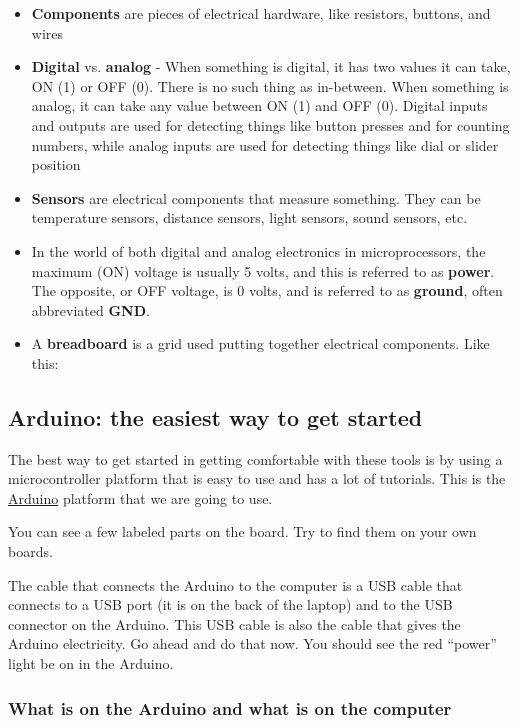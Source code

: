 \documentclass[letterpaper,10pt,english]{/usr/local/lib/python2.7/dist-packages/sphinx/texinputs/sphinxhowto}
\begin{document}
\begin{itemize}
\item
  \textbf{Components} are pieces of electrical hardware, like resistors,
  buttons, and wires
\item
  \textbf{Digital} vs. \textbf{analog} - When something is digital, it
  has two values it can take, ON (1) or OFF (0). There is no such thing
  as in-between. When something is analog, it can take any value between
  ON (1) and OFF (0). Digital inputs and outputs are used for detecting
  things like button presses and for counting numbers, while analog
  inputs are used for detecting things like dial or slider position
\item
  \textbf{Sensors} are electrical components that measure something.
  They can be temperature sensors, distance sensors, light sensors,
  sound sensors, etc.
\item
  In the world of both digital and analog electronics in
  microprocessors, the maximum (ON) voltage is usually 5 volts, and this
  is referred to as \textbf{power}. The opposite, or OFF voltage, is 0
  volts, and is referred to as \textbf{ground}, often abbreviated
  \textbf{GND}.
\item
  A \textbf{breadboard} is a grid used putting together electrical
  components. Like this:
\end{itemize}\subsection{Arduino: the easiest way to get started }

The best way to get started in getting comfortable with these tools is
by using a microcontroller platform that is easy to use and has a lot of
tutorials. This is the \href{http://arduino.cc}{Arduino} platform that
we are going to use.

You can see a few labeled parts on the board. Try to find them on your
own boards.

The cable that connects the Arduino to the computer is a USB cable that
connects to a USB port (it is on the back of the laptop) and to the USB
connector on the Arduino. This USB cable is also the cable that gives
the Arduino electricity. Go ahead and do that now. You should see the
red ``power'' light be on in the Arduino.\subsubsection{What is on the Arduino and what is on the computer}
\end{document}
